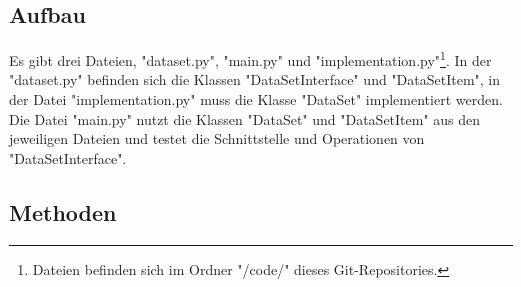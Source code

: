 \documentclass[oneside, 11pt, a4paper, parskip=full]{scrartcl}
\begin{document}
\subsection{Aufbau}

Es gibt drei Dateien, "dataset.py", "main.py" und "implementation.py"\footnote[1]{Dateien befinden sich im Ordner "/code/" dieses Git-Repositories.}.
In der "dataset.py" befinden sich die Klassen "DataSetInterface" und "DataSetItem",
in der Datei "implementation.py" muss die Klasse "DataSet" implementiert werden.
Die Datei "main.py" nutzt die Klassen "DataSet" und "DataSetItem" aus den jeweiligen Dateien und testet die Schnittstelle und Operationen von "DataSetInterface".

\subsection{Methoden}
\end{document}

